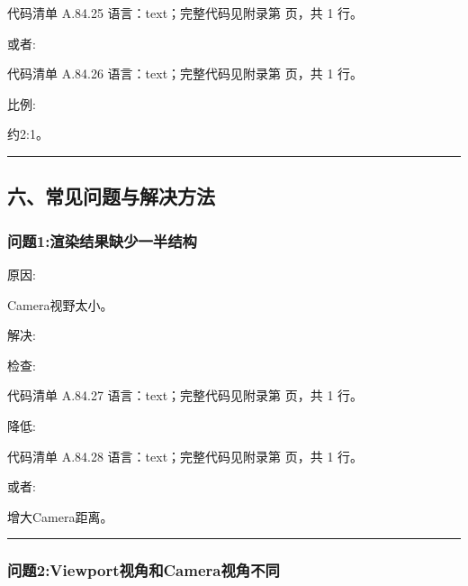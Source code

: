 \documentclass[lang=cn,scheme=chinese,color=blue,device=normal,toc=onecol,math=cm]{elegantbook}
\begin{document}
\begin{codeindexbox}{代码清单 A.84.25}
语言：text；完整代码见附录第 \pageref{code:84:25} 页，共 1 行。
\end{codeindexbox}


或者:\par


\begin{codeindexbox}{代码清单 A.84.26}
语言：text；完整代码见附录第 \pageref{code:84:26} 页，共 1 行。
\end{codeindexbox}


比例:\par


约2:1。\par


\medskip\hrule\medskip


\subsection{六、常见问题与解决方法}


\subsubsection{问题1:渲染结果缺少一半结构}


原因:\par


Camera视野太小。\par


解决:\par


检查:\par


\begin{codeindexbox}{代码清单 A.84.27}
语言：text；完整代码见附录第 \pageref{code:84:27} 页，共 1 行。
\end{codeindexbox}


降低:\par


\begin{codeindexbox}{代码清单 A.84.28}
语言：text；完整代码见附录第 \pageref{code:84:28} 页，共 1 行。
\end{codeindexbox}


或者:\par


增大Camera距离。\par


\medskip\hrule\medskip


\subsubsection{问题2:Viewport视角和Camera视角不同}
\end{document}
